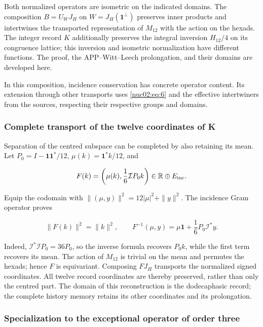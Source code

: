 Both normalized operators are isometric on the indicated domains. The composition \(B=U_WJ_H\) on \(W=J_H(\mathbf1^\perp)\) preserves inner products and intertwines the transported representation of \(M_{12}\) with the action on the hexads. The integer record \(K\) additionally preserves the integral inversion \(H_{12}/4\) on its congruence lattice; this inversion and isometric normalization have different functions. The proof, the APP–Witt–Leech prolongation, and their domains are developed here.

In this composition, incidence conservation has concrete operator content. Its extension through other transports uses \eqref{nuc02:eq:6} and the effective intertwiners from the sources, respecting their respective groups and domains.

\subsubsection{Complete transport of the twelve coordinates of K}

Separation of the centred subspace can be completed by also retaining its mean. Let \(P_0=I-\mathbf1\mathbf1^*/12\), \(\mu(k)=\mathbf1^*k/12\), and

\[
F(k)=\left(\mu(k),\frac16\mathcal I P_0k\right)\in\mathbb R\oplus E_{\rm inc}.
\]

Equip the codomain with \(\|(\mu,y)\|^2=12|\mu|^2+\|y\|^2\). The incidence Gram operator proves

\begin{equation}
\|F(k)\|^2=\|k\|^2,\qquad
\boxed{F^{-1}(\mu,y)=\mu\mathbf1+\frac16P_0\mathcal I^*y.}\label{nuc02:eq:6a}
\end{equation}

Indeed, \(\mathcal I^*\mathcal I P_0=36P_0\), so the inverse formula recovers \(P_0k\), while the first term recovers its mean. The action of \(M_{12}\) is trivial on the mean and permutes the hexads; hence \(F\) is equivariant. Composing \(FJ_H\) transports the normalized signed coordinates. All twelve record coordinates are thereby preserved, rather than only the centred part. The domain of this reconstruction is the dodecaphasic record; the complete history memory retains its other coordinates and its prolongation.

\subsubsection{Specialization to the exceptional operator of order three}

